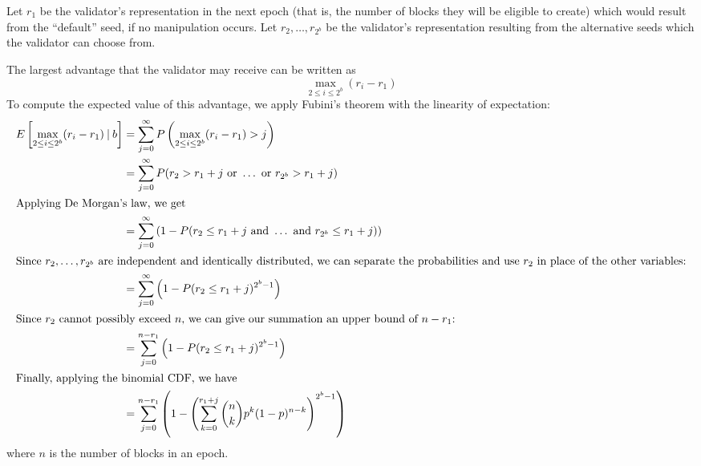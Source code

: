 Let $r_1$ be the validator's representation in the next epoch (that is, the number of blocks they will be eligible to create) which would result from the ``default'' seed, if no manipulation occurs. Let $r_2, \dots, r_{2^b}$ be the validator's representation resulting from the alternative seeds which the validator can choose from.

The largest advantage that the validator may receive can be written as
\[ \max_{2 \le i \le 2^b}(r_i - r_1) \]
To compute the expected value of this advantage, we apply Fubini's theorem with the linearity of expectation:
\begin{align*}
E\left[ \max_{2 \le i \le 2^b}(r_i - r_1) \mathbin{\vert} b \right] &= \sum_{j=0}^{\infty} P\left( \max_{2 \le i \le 2^b}(r_i - r_1) > j \right) \\
&= \sum_{j=0}^{\infty} P(r_2 > r_1 + j \text{ or } \dots \text { or } r_{2^b} > r_1 + j) \\
\intertext{Applying De Morgan's law, we get}
&= \sum_{j=0}^{\infty} \left( 1 - P(r_2 \le r_1 + j \text{ and } \dots \text { and } r_{2^b} \le r_1 + j) \right) \\
\intertext{Since $r_2, \dots, r_{2^b}$ are independent and identically distributed, we can separate the probabilities and use $r_2$ in place of the other variables:}
&= \sum_{j=0}^{\infty} \left( 1 - P(r_2 \le r_1 + j)^{2^b - 1} \right) \\
\intertext{Since $r_2$ cannot possibly exceed $n$, we can give our summation an upper bound of $n - r_1$:}
&= \sum_{j=0}^{n - r_1} \left( 1 - P(r_2 \le r_1 + j)^{2^b - 1} \right) \\
\intertext{Finally, applying the binomial CDF, we have}
&= \sum_{j=0}^{n - r_1} \left( 1 - \left( \sum_{k=0}^{r_1 + j} \binom{n}{k} p^k (1-p)^{n-k} \right)^{2^b - 1} \right)
\end{align*}
where $n$ is the number of blocks in an epoch.

